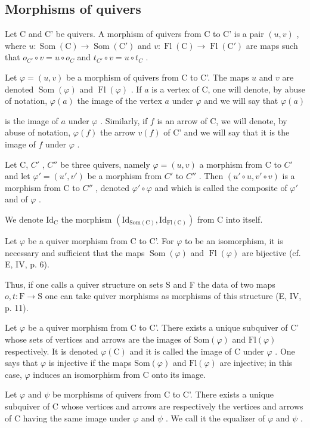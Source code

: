 \subsection{Morphisms of quivers}

Let C and C' be quivers. A morphism of quivers from C to C' is a pair \((u,v)\) , where \(u\colon\operatorname{Som}(\mathrm{C})\to\operatorname{Som}(\mathrm{C}')\) and \(v\colon\operatorname{Fl}(\mathrm{C})\to\operatorname{Fl}(\mathrm{C}')\) are maps such that \(o_{C'}\circ v=u\circ o_{C}\) and \(t_{C'}\circ v=u\circ t_{C}\) .

Let \(\varphi = (u, v)\) be a morphism of quivers from C to C'. The maps \(u\) and \(v\) are denoted \(\operatorname{Som}(\varphi)\) and \(\operatorname{Fl}(\varphi)\) . If \(a\) is a vertex of C, one will denote, by abuse of notation, \(\varphi(a)\) the image of the vertex \(a\) under \(\varphi\) and we will say that \(\varphi(a)\)

is the image of \(a\) under \(\varphi\) . Similarly, if \(f\) is an arrow of C, we will denote, by abuse of notation, \(\varphi(f)\) the arrow \(v(f)\) of C' and we will say that it is the image of \(f\) under \(\varphi\) .

Let C, \(C'\) , \(C''\) be three quivers, namely \(\varphi = (u, v)\) a morphism from C to \(C'\) and let \(\varphi' = (u', v')\) be a morphism from \(C'\) to \(C''\) . Then \((u' \circ u, v' \circ v)\) is a morphism from C to \(C''\) , denoted \(\varphi' \circ \varphi\) and which is called the composite of \(\varphi'\) and of \(\varphi\) .

We denote \(\mathrm{Id}_{\mathrm{C}}\) the morphism \((\mathrm{Id}_{\mathrm{Som}(\mathrm{C})}, \mathrm{Id}_{\mathrm{Fl}(\mathrm{C})})\) from C into itself.

Let \(\varphi\) be a quiver morphism from C to C'. For \(\varphi\) to be an isomorphism, it is necessary and sufficient that the maps \(\operatorname{Som}(\varphi)\) and \(\operatorname{Fl}(\varphi)\) are bijective (cf. E, IV, p. 6).

Thus, if one calls a quiver structure on sets S and F the data of two maps \(o, t: \mathrm{F} \to \mathrm{S}\) one can take quiver morphisms as morphisms of this structure (E, IV, p. 11).

Let \(\varphi\) be a quiver morphism from C to C'. There exists a unique subquiver of C' whose sets of vertices and arrows are the images of \(\mathrm{Som}(\varphi)\) and \(\mathrm{Fl}(\varphi)\) respectively. It is denoted \(\varphi(\mathrm{C})\) and it is called the image of C under \(\varphi\) . One says that \(\varphi\) is injective if the maps \(\mathrm{Som}(\varphi)\) and \(\mathrm{Fl}(\varphi)\) are injective; in this case, \(\varphi\) induces an isomorphism from C onto its image.

Let \(\varphi\) and \(\psi\) be morphisms of quivers from C to C'. There exists a unique subquiver of C whose vertices and arrows are respectively the vertices and arrows of C having the same image under \(\varphi\) and \(\psi\) . We call it the equalizer of \(\varphi\) and \(\psi\) .

